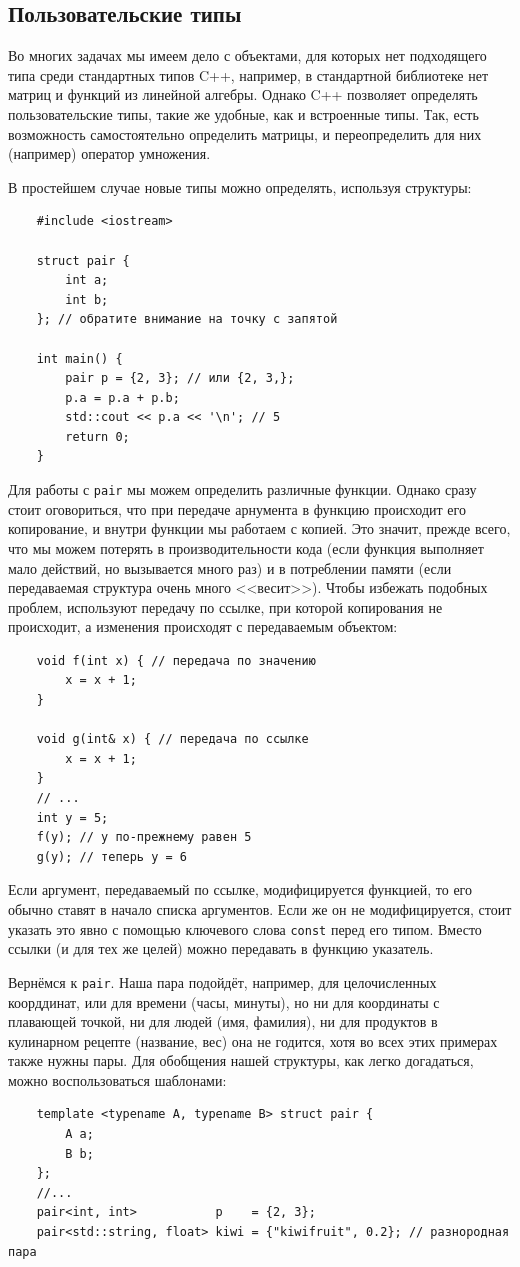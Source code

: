 \documentclass{book}
\begin{document}
\clearpage

\subsection{Пользовательские типы}

Во многих задачах мы имеем дело с объектами, для которых нет подходящего типа среди стандартных
типов C++, например, в стандартной библиотеке нет матриц и функций из линейной алгебры. Однако C++
позволяет определять пользовательские типы, такие же удобные, как и встроенные типы. Так, есть
возможность самостоятельно определить матрицы, и переопределить для них (например) оператор
умножения.

В простейшем случае новые типы можно определять, используя структуры:
\begin{verbatim}
    #include <iostream>

    struct pair {
        int a;
        int b;
    }; // обратите внимание на точку с запятой

    int main() {
        pair p = {2, 3}; // или {2, 3,};
        p.a = p.a + p.b;
        std::cout << p.a << '\n'; // 5
        return 0;
    }
\end{verbatim}
Для работы с \texttt{pair} мы можем определить различные функции. Однако сразу стоит
оговориться, что при передаче арнумента в функцию происходит его копирование, и внутри функции мы
работаем с копией. Это значит, прежде всего, что мы можем потерять в производительности кода (если
функция выполняет мало действий, но вызывается много раз) и в потреблении памяти (если передаваемая
структура очень много <<весит>>). Чтобы избежать подобных проблем, используют передачу по ссылке,
при которой копирования не происходит, а изменения происходят с передаваемым объектом:
\begin{verbatim}
    void f(int x) { // передача по значению
        x = x + 1; 
    }

    void g(int& x) { // передача по ссылке
        x = x + 1; 
    }
    // ... 
    int y = 5; 
    f(y); // y по-прежнему равен 5
    g(y); // теперь y = 6
\end{verbatim}
Если аргумент, передаваемый по ссылке, модифицируется функцией, то его обычно ставят в начало
списка аргументов. Если же он не модифицируется, стоит указать это явно с помощью ключевого слова
\texttt{const} перед его типом. Вместо ссылки (и для тех же целей) можно передавать в
функцию указатель.

Вернёмся к \texttt{pair}.  Наша пара подойдёт, например, для целочисленных коорддинат, или
для времени (часы, минуты), но ни для координаты с плавающей точкой, ни для людей (имя, фамилия),
ни для продуктов в кулинарном рецепте (название, вес) она не годится, хотя во всех этих примерах
также нужны пары. Для обобщения нашей структуры, как легко догадаться, можно воспользоваться
шаблонами:
\begin{verbatim}
    template <typename A, typename B> struct pair {
        A a;
        B b;
    };
    //...
    pair<int, int>           p    = {2, 3};
    pair<std::string, float> kiwi = {"kiwifruit", 0.2}; // разнородная пара
\end{verbatim}
\end{document}
